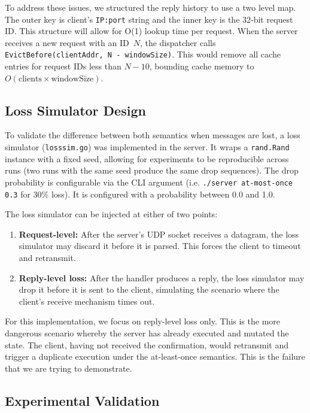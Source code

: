 \documentclass[9pt,a4paper]{article}
\begin{document}
To address these issues, we structured the reply history to use a two level map.
The outer key is client's \texttt{IP:port} string and the inner key is the 32-bit request ID.
This structure will allow for O(1) lookup time per request.
When the server receives a new request with an ID~$N$, the dispatcher calls \texttt{EvictBefore(clientAddr, N - windowSize)}.
This would remove all cache entries for request IDs less than $N - 10$, bounding cache memory to $O(\text{clients} \times \text{windowSize})$.


\subsection{Loss Simulator Design}

To validate the difference between both semantics when messages are lost, a loss simulator (\texttt{losssim.go}) was implemented in the server. 
It wraps a \texttt{rand.Rand} instance with a fixed seed, allowing for experiments to be reproducible across runs (two runs with the same seed produce the same drop sequences).
The drop probability is configurable via the CLI argument (i.e. \texttt{./server at-most-once 0.3} for 30\% loss).
It is configured with a probability between 0.0 and 1.0.

The loss simulator can be injected at either of two points:
\begin{enumerate}
    \item \textbf{Request-level:} After the server's UDP socket receives a datagram, the loss simulator may discard it before it is parsed. This forces the client to timeout and retransmit.
    \item \textbf{Reply-level loss:} After the handler produces a reply, the loss simulator may drop it before it is sent to the client, simulating the scenario where the client's receive mechanism times out.
\end{enumerate}

For this implementation, we focus on reply-level loss only.
This is the more dangerous scenario whereby the server has already executed and mutated the state.
The client, having not received the confirmation, would retransmit and trigger a duplicate execution under the at-least-once semantics.
This is the failure that we are trying to demonstrate.

\subsection{Experimental Validation}
\end{document}
